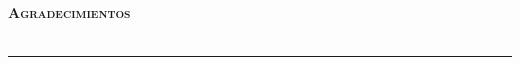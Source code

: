 
\newpage
\thispagestyle{empty}
\begin{Huge}
    \bfseries \selectfont \scshape Agradecimientos \\\\
    \rule[0.5ex]{\linewidth}{1pt}
\end{Huge}

\lipsum[1]